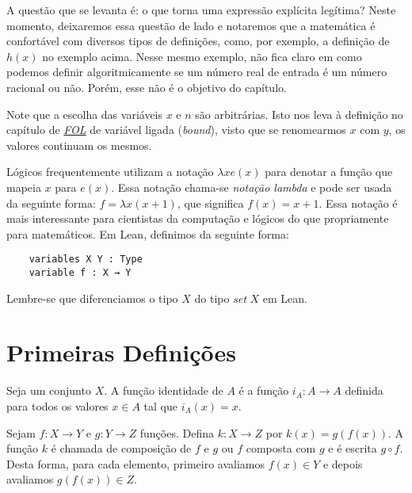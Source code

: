 A questão que se levanta é: o que torna uma expressão explícita legítima?
Neste momento, deixaremos essa questão de lado e notaremos que a matemática
é confortável com diversos tipos de definições, como, por exemplo, a definição
de $h(x)$ no exemplo acima. Nesse mesmo exemplo, não fica claro em como podemos
definir algoritmicamente se um número real de entrada é um número racional ou não.
Porém, esse não é o objetivo do capítulo.

Note que a escolha das variáveis $x$ e $n$ são arbitrárias.
Isto nos leva à definição no capítulo de \textit{\hyperlink{chapter.2}{FOL}} de
variável ligada (\textit{bound}), visto que se renomearmos $x$ com $y$, os valores
continuam os mesmos.

Lógicos frequentemente utilizam a notação $\lambda x e(x)$ para denotar a função
que mapeia $x$ para $e(x)$. Essa notação chama-se \textit{notação lambda} e pode
ser usada da seguinte forma: $f = \lambda x(x + 1)$, que significa $f(x) = x + 1$.
Essa notação é mais interessante para cientistas da computação e lógicos do que
propriamente para matemáticos. Em Lean, definimos da seguinte forma:

\begin{lstlisting}
    variables X Y : Type
    variable f : X → Y
\end{lstlisting}

Lembre-se que diferenciamos o tipo $X$ do tipo $set~X$ em Lean.

\section{Primeiras Definições}

\theoremstyle{definition}

\theoremstyle{definition}
\newtheorem{example}{Exemplo}[section]

\theoremstyle{plain}

\theoremstyle{plain}
\newtheorem{corollary}{Corolário}[section]

\begin{definition}
    \label{def1}
    Seja um conjunto $X$. A função identidade de $A$ é a função
    $i_A : A \rightarrow A$ definida para todos os valores $x \in A$ tal que $i_A(x) = x$.
\end{definition}

\begin{definition}
    \label{def2}
    Sejam $f : X \rightarrow Y$ e $g : Y \rightarrow Z$ funções.
    Defina $k : X \rightarrow Z$ por $k(x) = g(f(x))$. A função $k$ é chamada de composição
    de $f$ e $g$ ou $f$ composta com $g$ e é escrita $g \circ f$. Desta forma, para cada elemento,
    primeiro  avaliamos $f(x) \in Y$ e depois avaliamos $g(f(x)) \in Z$.
\end{definition}

